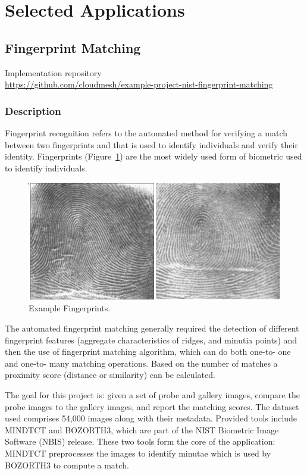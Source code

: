 \documentclass[9pt,twocolumn,twoside]{styles/osajnl}
\begin{document}
\section{Selected Applications}

\subsection{Fingerprint Matching}

Implementation repository\\
\url{https://github.com/cloudmesh/example-project-nist-fingerprint-matching}

\subsubsection{Description}

Fingerprint recognition refers to the automated method for verifying a
match between two fingerprints and that is used to identify
individuals and verify their identity. Fingerprints
(Figure~\ref{F:NIST-fingerprints}) are the most widely used form of
biometric used to identify individuals.



\begin{figure}[htb]
  \centering
      \includegraphics[width=0.9\columnwidth]{images/fingerprints}
  \caption{Example Fingerprints.}
  \label{F:NIST-fingerprints}
\end{figure}



The automated fingerprint matching generally required the detection of
different fingerprint features (aggregate characteristics of ridges,
and minutia points) and then the use of fingerprint matching
algorithm, which can do both one-to- one and one-to- many matching
operations. Based on the number of matches a proximity score (distance
or similarity) can be calculated.


The goal for this project is: given a set of probe and gallery images,
compare the probe images to the gallery images, and report the
matching scores.  The dataset used comprises 54,000 images along with
their metadata. Provided tools include MINDTCT and BOZORTH3, which are
part of the NIST Biometric Image Software (NBIS) release. These two
tools form the core of the application: MINDTCT preprocesses the
images to identify minutae which is used by BOZORTH3 to compute a
match.
\end{document}
